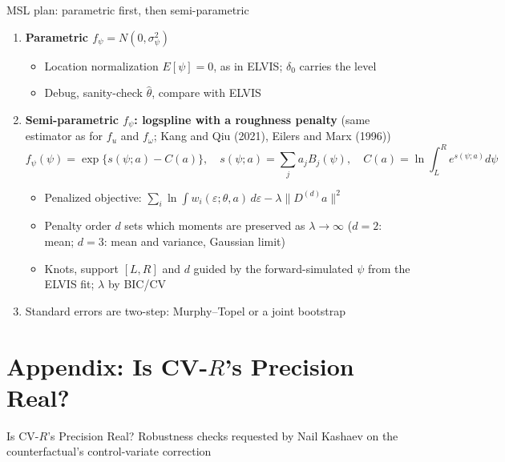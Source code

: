 \documentclass[
  ignorenonframetext,
  aspectratio=169,
]{beamer}
\providecommand{\tightlist}{%
  \setlength{\itemsep}{0pt}\setlength{\parskip}{0pt}}
\begin{document}
\begin{frame}{MSL plan: parametric first, then semi-parametric}
\protect{}\label{msl-plan-parametric-first-then-semi-parametric}
\begin{enumerate}
\tightlist
\item
  \textbf{Parametric \(f_\psi=N(0,\sigma^2_\psi)\)}

  \begin{itemize}
  \tightlist
  \item
    Location normalization \(E[\psi]=0\), as in ELVIS; \(\delta_0\)
    carries the level
  \item
    Debug, sanity-check \(\hat\theta\), compare with ELVIS
  \end{itemize}
\item
  \textbf{Semi-parametric \(f_\psi\): logspline with a roughness
  penalty} (same estimator as for \(f_u\) and \(f_\omega\); Kang and Qiu
  (2021), Eilers and Marx (1996)) \[
  f_\psi(\psi)=\exp\{s(\psi;a)-C(a)\},\quad s(\psi;a)=\sum_j a_jB_j(\psi),\quad C(a)=\ln\!\int_L^R e^{s(\psi;a)}d\psi
  \]

  \begin{itemize}
  \tightlist
  \item
    Penalized objective:
    \(\sum_i\ln\!\int w_i(\varepsilon;\theta,a)\,d\varepsilon-\lambda\|D^{(d)}a\|^2\)
  \item
    Penalty order \(d\) sets which moments are preserved as
    \(\lambda\to\infty\) (\(d=2\): mean; \(d=3\): mean and variance,
    Gaussian limit)
  \item
    Knots, support \([L,R]\) and \(d\) guided by the forward-simulated
    \(\psi\) from the ELVIS fit; \(\lambda\) by BIC/CV
  \end{itemize}
\item
  Standard errors are two-step: Murphy--Topel or a joint bootstrap
\end{enumerate}
\end{frame}

\section{\texorpdfstring{Appendix: Is CV-\(R\)'s Precision
Real?}{Appendix: Is CV-R's Precision Real?}}\label{appendix-is-cv-rs-precision-real}

\begin{frame}{Is CV-\(R\)'s Precision Real?}
\protect{}\label{sec-cv-diagnostic}
Robustness checks requested by Nail Kashaev on the counterfactual's
control-variate correction
\end{frame}
\end{document}
